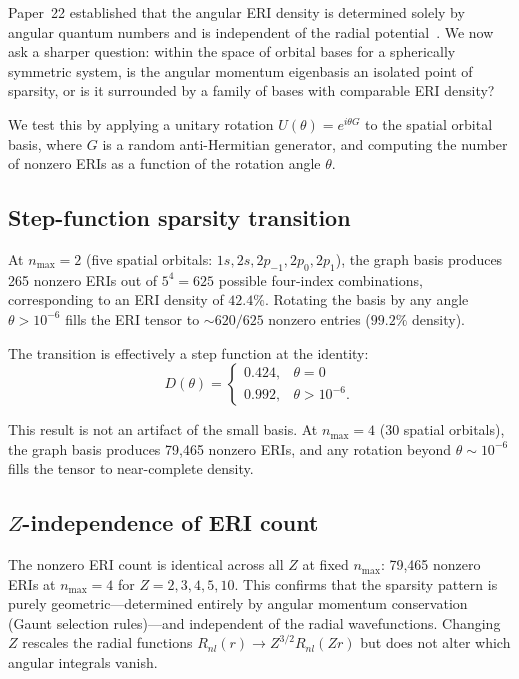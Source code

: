\documentclass[twocolumn,pra,amsmath,amssymb,superscriptaddress]{revtex4-2}
\begin{document}
Paper~22 established that the angular ERI density is determined
solely by angular quantum numbers and is independent of the radial
potential~\cite{GeoVac_Paper22}.  We now ask a sharper question:
within the space of orbital bases for a spherically symmetric
system, is the angular momentum eigenbasis an isolated point of
sparsity, or is it surrounded by a family of bases with comparable
ERI density?

We test this by applying a unitary rotation
$U(\theta) = e^{i \theta G}$ to the spatial orbital basis, where
$G$ is a random anti-Hermitian generator, and computing the number
of nonzero ERIs as a function of the rotation angle $\theta$.

\subsection{Step-function sparsity transition}

At $n_{\max} = 2$ (five spatial orbitals: $1s, 2s, 2p_{-1}, 2p_0,
2p_1$), the graph basis produces 265 nonzero ERIs out of
$5^4 = 625$ possible four-index combinations, corresponding to an
ERI density of $42.4\%$.  Rotating the basis by any angle
$\theta > 10^{-6}$ fills the ERI tensor to $\sim 620/625$ nonzero
entries ($99.2\%$ density).

The transition is effectively a step function at the identity:
\begin{equation}
  D(\theta) =
  \begin{cases}
    0.424, & \theta = 0 \\
    0.992, & \theta > 10^{-6}.
  \end{cases}
  \label{eq:step}
\end{equation}

This result is not an artifact of the small basis.  At
$n_{\max} = 4$ (30 spatial orbitals), the graph basis produces
79,465 nonzero ERIs, and any rotation beyond $\theta \sim 10^{-6}$
fills the tensor to near-complete density.

\subsection{$Z$-independence of ERI count}

The nonzero ERI count is identical across all $Z$ at fixed
$n_{\max}$: 79,465 nonzero ERIs at $n_{\max} = 4$ for
$Z = 2, 3, 4, 5, 10$.  This confirms that the sparsity pattern
is purely geometric---determined entirely by angular momentum
conservation (Gaunt selection rules)---and independent of the
radial wavefunctions.  Changing $Z$ rescales the radial functions
$R_{nl}(r) \to Z^{3/2} R_{nl}(Zr)$ but does not alter which
angular integrals vanish.
\end{document}
